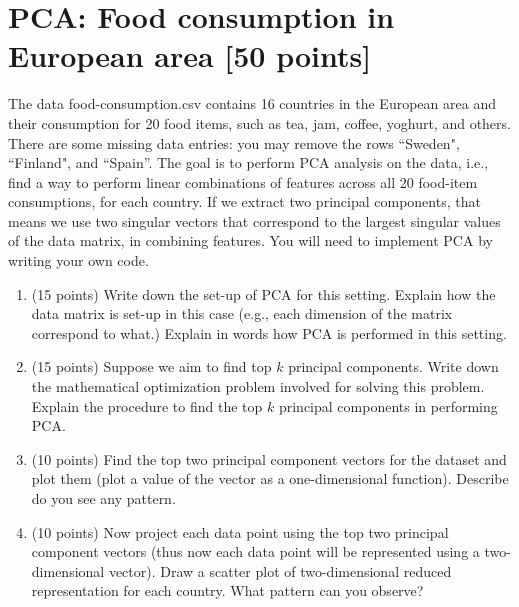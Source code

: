\documentclass[twoside,10pt]{article}
\begin{document}
\section{PCA: Food consumption in European area [50 points]}

The data \textsf{food-consumption.csv} contains 16 countries in the European area and their consumption for 20 food items, such as tea, jam, coffee, yoghurt, and others. There are some missing data entries: you may remove the rows ``Sweden", ``Finland", and ``Spain''. The goal is to perform PCA analysis on the data, i.e., find a way to perform linear combinations of features across all 20 food-item consumptions, for each country. If we extract two principal components, that means we use two singular vectors that correspond to the largest singular values of the data matrix, in combining features. You will need to implement PCA by writing your own code.
\begin{enumerate}
\item (15 points) Write down the set-up of PCA for this setting. Explain how the data matrix is set-up in this case (e.g., each dimension of the matrix correspond to what.) Explain in words how PCA is performed in this setting. 
\item (15 points) Suppose we aim to find top $k$ principal components. Write down the mathematical optimization problem involved for solving this problem. Explain the procedure to find the top $k$ principal components in performing PCA. 
\item (10 points) Find the top two principal component vectors for the dataset and plot them (plot a value of the vector as a one-dimensional function). Describe do you see any pattern. 
\item (10 points) Now project each data point using the top two principal component vectors (thus now each data point will be represented using a two-dimensional vector). Draw a scatter plot of two-dimensional reduced representation for each country. What pattern can you observe?
\end{enumerate}

%
%
\end{document}
